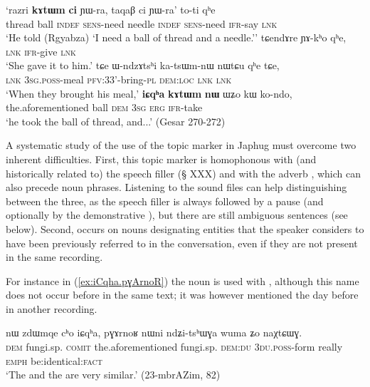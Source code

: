  
\begin{exe}
\ex \label{ex:iCqha.aforementioned}
\begin{xlist}
\ex \label{ex:kAtWm}
\gll `razri \textbf{kɤtɯm} \textbf{ci} ɲɯ-ra, taqaβ ci ɲɯ-ra' to-ti qʰe   \\
 thread ball \textsc{indef} \textsc{sens}-need needle \textsc{indef} \textsc{sens}-need \textsc{ifr}-say \textsc{lnk}  \\
\glt `He told (Rgyabza) `I need a ball of thread and a needle.''  
\ex  
\gll tɕendɤre ɲɤ-kʰo qʰe,  \\
\textsc{lnk} \textsc{ifr}-give \textsc{lnk}   \\
\glt `She gave it to him.'
\ex 
\gll  tɕe ɯ-ndzɤtsʰi ka-tsɯm-nɯ nɯtɕu qʰe tɕe,   \\
 \textsc{lnk} \textsc{3sg}.\textsc{poss}-meal \textsc{pfv}:3\fl{}3'-bring-\textsc{pl} \textsc{dem}:\textsc{loc}  \textsc{lnk} \textsc{lnk}    \\
\glt `When they brought his meal,'
\ex \label{ex:iCqha.kAtWm}
\gll   \textbf{iɕqʰa} \textbf{kɤtɯm} \textbf{nɯ} ɯʑo kɯ ko-ndo, \\
   the.aforementioned ball \textsc{dem} \textsc{3sg} \textsc{erg} \textsc{ifr}-take \\
\glt `he took the ball of thread, and...' (Gesar 270-272)
\end{xlist}
\end{exe}
 
 
A systematic study of the use of the topic marker  in Japhug must overcome two inherent difficulties. First, this topic marker is homophonous with (and historically related to) the speech filler  (§ XXX) and with the adverb , which can also precede noun phrases. Listening to the sound files can help distinguishing between the three, as the speech filler is always followed by a pause (and optionally by the demonstrative ), but there are still ambiguous sentences (see below). Second,  occurs on nouns designating entities that the speaker considers to have been previously referred to in the conversation, even if they are not present in the same recording. 

For instance in (\ref{ex:iCqha.pɣArnoR}) the noun  is used with , although this name does not occur before in the same text; it was however mentioned the day before in another recording.

\begin{exe}
\ex \label{ex:iCqha.pɣArnoR}
\gll nɯ zdɯmqe cʰo iɕqʰa, pɣɤrnoʁ nɯni ndʑi-tsʰɯɣa wuma ʑo naχtɕɯɣ. \\
\textsc{dem} fungi.sp. \textsc{comit} the.aforementioned fungi.sp. \textsc{dem}:\textsc{du} \textsc{3du}.\textsc{poss}-form really \textsc{emph} be:identical:\textsc{fact} \\
\glt `The  and the  are very similar.' (23-mbrAZim, 82)
\end{exe}

